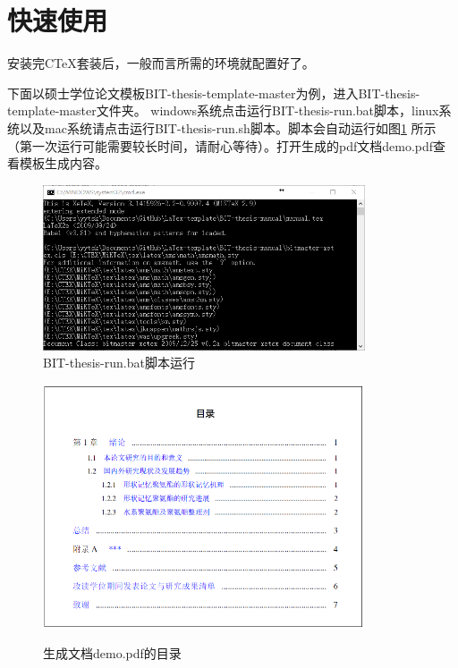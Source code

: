 \section{快速使用}
\label{sec:process}

安装完CTeX套装后，一般而言所需的环境就配置好了。

下面以硕士学位论文模板BIT-thesis-template-master为例，进入BIT-thesis-template-master文件夹。
windows系统点击运行BIT-thesis-run.bat脚本，linux系统以及mac系统请点击运行BIT-thesis-run.sh脚本。脚本会自动运行如图\ref{fig:run} 所示（第一次运行可能需要较长时间，请耐心等待）。打开生成的pdf文档demo.pdf查看模板生成内容。
 
\begin{figure}[!htp]
  \centering
  \includegraphics[width=0.85\textwidth]{figures/BIT-thesis-run}
  \caption{BIT-thesis-run.bat脚本运行}
  \label{fig:run}
\end{figure}


\begin{figure}[!htp]
  \centering
  {\includegraphics[width=0.85\textwidth]{figures/demo_context}}
  \caption{生成文档demo.pdf的目录}
  \label{fig:demo_context}
\end{figure}

